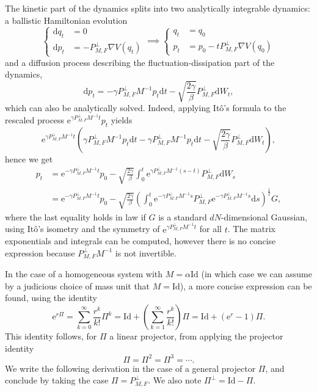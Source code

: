\documentclass[a4paper,10pt,twoside,leqno]{report}
\newcommand{\Id}{\mathrm{Id}}
\newcommand{\dif}{\mathrm{d}}
\newcommand{\1}{\mathbbm{1}}
\newcommand{\e}{\mathrm{e}}
\begin{document}
    The kinetic part of the dynamics splits into two analytically integrable dynamics: a ballistic Hamiltonian evolution
    \begin{equation}
        \label{eq:elem_hamiltonian_equation}
        \left\{\begin{aligned}
            \dif q_t&=0\\
            \dif p_t&=-P_{M,F}^\perp\nabla V(q_t)
        \end{aligned}\right.\implies\left\{\begin{aligned}
            q_t&=q_0\\
            p_t&=p_0-tP_{M,F}^\perp\nabla V(q_0)
        \end{aligned}\right.
    \end{equation}
    and a diffusion process describing the fluctuation-dissipation part of the dynamics,
    \begin{equation}
        \label{eq:norton_ou_part}
        \dif p_t=-\gamma P_{M,F}^\perp M^{-1}p_t\dif t-\sqrt{\frac{2\gamma}{\beta}}P_{M,F}^\perp\dif W_t,
    \end{equation}
    which can also be analytically solved.
    Indeed, applying Itô's formula to the rescaled process $\e^{\gamma P_{M,F}^\perp M^{-1}t}p_t$ yields
    \[\mathrm{e}^{\gamma P_{M,F}^\perp M^{-1}t}\left(\gamma P_{M,F}^\perp M^{-1}p_t\dif t - \gamma P_{M,F}^\perp M^{-1}p_t\dif t-\sqrt{\frac{2\gamma}{\beta}} P_{M,F}^\perp\dif W_t\right),\]
    hence we get 
    \begin{equation}
        \label{eq:projected_ou_analytical_form}
        \begin{aligned}
        p_t&=\mathrm{e}^{-\gamma P_{M,F}^\perp M^{-1}t}p_0-\sqrt{\frac{2\gamma}{\beta}}\int_0^t\mathrm{e}^{\gamma P_{M,F}^\perp M^{-1}(s-t)} P_{M,F}^\perp\dif W_s\\
        &=\mathrm{e}^{-\gamma P_{M,F}^\perp M^{-1}t}p_0-\sqrt{\frac{2\gamma}{\beta}}\left(\int_0^t\e^{-\gamma P_{M,F}^\perp M^{-1}s}P_{M,F}^\perp\e^{-\gamma P_{M,F}^\perp M^{-1}s} \dif s\right)^{\frac12}G,
        \end{aligned}
    \end{equation}
    where the last equality holds in law if $G$ is a standard $dN$-dimensional Gaussian, using Itô's isometry and the symmetry of $\e^{\gamma P_{M,F}^\perp M^{-1}t}$ for all $t$.
    The matrix exponentials and integrals can be computed, however there is no concise expression because $P_{M,F}^\perp M^{-1}$ is not invertible.
    
    In the case of a homogeneous system with $M=\alpha\Id$ (in which case we can assume by a judicious choice of mass unit that $M=\Id$), a more concise expression can be found, using the identity
    \begin{equation}
         \label{eq:rodrigues_formula}\e^{r\Pi}=\sum_{k=0}^\infty \frac{r^k}{k!}\Pi^k=\Id+\left(\sum_{k=1}^\infty\frac{r^k}{k!}\right)\Pi=\Id+\left(\e^r-1\right)\Pi.
    \end{equation}
    This identity follows, for $\Pi$ a linear projector, from applying the projector identity \[\Pi=\Pi^2=\Pi^3=\dotsm.\]
    We write the following derivation in the case of a general projector $\Pi$, and conclude by taking the case $\Pi=P_{M,F}^\perp$. We also note $\Pi^\perp=\Id-\Pi$.
    
\end{document}
